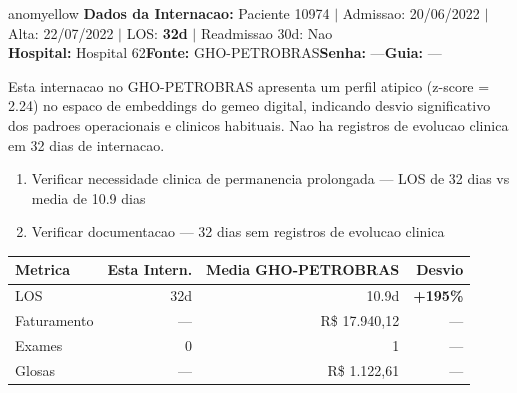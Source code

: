 \documentclass[a4paper,10pt]{article}
\begin{document}
\begin{anomalycard}[Internacao 11490 | GHO-PETROBRAS | MODERADO (z=2.24)]{anomyellow}
\textbf{Dados da Internacao:} Paciente 10974 $\mid$ Admissao: 20/06/2022 $\mid$ Alta: 22/07/2022 $\mid$ LOS: \textbf{32d} $\mid$ Readmissao 30d: Nao\\
\textbf{Hospital:} Hospital 62\quad\textbf{Fonte:} GHO-PETROBRAS\quad\textbf{Senha:} ---\quad\textbf{Guia:} ---\\
\vspace{2pt}\begin{tcolorbox}[colback=severityred!20,colframe=anomyellow,title={\textbf{Interpretacao de Negocio}},fonttitle=\bfseries\small,left=4pt,right=4pt,top=3pt,bottom=3pt]
{\small Esta internacao no GHO-PETROBRAS apresenta um perfil atipico (z-score = 2.24) no espaco de embeddings do gemeo digital, indicando desvio significativo dos padroes operacionais e clinicos habituais. Nao ha registros de evolucao clinica em 32 dias de internacao.}
\end{tcolorbox}
\begin{tcolorbox}[colback=severityyellow!30,colframe=anomorange,title={\textbf{Recomendacoes Especificas}},fonttitle=\bfseries\small,left=4pt,right=4pt,top=3pt,bottom=3pt]
\begin{enumerate}[nosep,leftmargin=16pt]
\item {\small Verificar necessidade clinica de permanencia prolongada --- LOS de 32 dias vs media de 10.9 dias}
\item {\small Verificar documentacao --- 32 dias sem registros de evolucao clinica}
\end{enumerate}
\end{tcolorbox}
\begin{center}\begin{tabular}{l r r r}\toprule\textbf{Metrica} & \textbf{Esta Intern.} & \textbf{Media GHO-PETROBRAS} & \textbf{Desvio} \\\midrule
LOS & 32d & 10.9d & \textcolor{anomred}{\textbf{+195\%}} \\
Faturamento & --- & R\$ 17.940,12 & --- \\
Exames & 0 & 1 & --- \\
Glosas & --- & R\$ 1.122,61 & --- \\
\bottomrule\end{tabular}\end{center}


\end{anomalycard}
\end{document}
